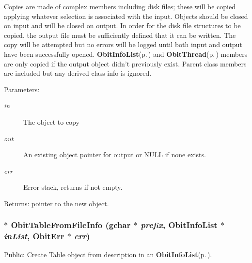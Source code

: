 Copies are made of complex members including disk files; these will be copied applying whatever selection is associated with the input. Objects should be closed on input and will be closed on output. In order for the disk file structures to be copied, the output file must be sufficiently defined that it can be written. The copy will be attempted but no errors will be logged until both input and output have been successfully opened. {\bf Obit\-Info\-List}{\rm (p.\,\pageref{structObitInfoList})} and {\bf Obit\-Thread}{\rm (p.\,\pageref{structObitThread})} members are only copied if the output object didn't previously exist. Parent class members are included but any derived class info is ignored. \begin{Desc}
\item[Parameters:]
\begin{description}
\item[{\em in}]The object to copy \item[{\em out}]An existing object pointer for output or NULL if none exists. \item[{\em err}]Error stack, returns if not empty. \end{description}
\end{Desc}
\begin{Desc}
\item[Returns:]pointer to the new object. \end{Desc}
\subsubsection{$\ast$ Obit\-Table\-From\-File\-Info (gchar $\ast$ {\em prefix}, {\bf Obit\-Info\-List} $\ast$ {\em in\-List}, {\bf Obit\-Err} $\ast$ {\em err})}\label{ObitTable_8h_a30}


Public: Create Table object from description in an {\bf Obit\-Info\-List}{\rm (p.\,\pageref{structObitInfoList})}. 

